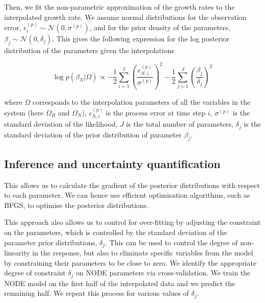 \documentclass[11pt, oneside]{article}
\begin{document}
Then, we fit the non-parametric approximation of the growth rates to the interpolated growth rate.
We assume normal distributions for the observation error, $\epsilon^{(p)}_i \sim \mathcal{N}(0,\sigma^{(p)})$, and for the prior density of the parameters, $\beta_j \sim \mathcal{N}(0,\delta_j)$.
This gives the following expression for the log posterior distribution of the parameters given the interpolations

\vspace{-0.5cm}
\begin{equation}
    \log p(\beta_N | \Omega) \propto - \frac{1}{2} \sum_{i=1}^{I} \left( \frac{\epsilon^{(p)}_{N,i}}{\sigma^{(p)}} \right)^2 - \frac{1}{2} \sum_{j=1}^{J} \left( \frac{\beta_j}{\delta_j} \right)^2
\end{equation}

where $\Omega$ corresponds to the interpolation parameters of all the variables in the system (here $\Omega_R$ and $\Omega_N$), 
$\epsilon^{(p)}_{N,i}$ is the process error at time step $i$, 
$\sigma^{(p)}$ is the standard deviation of the likelihood, 
$J$ is the total number of parameters, 
$\delta_j$ is the standard deviation of the prior distribution of parameter $\beta_j$.

\subsection{Inference and uncertainty quantification}

This allows us to calculate the gradient of the posterior distributions with respect to each parameter.
We can hence use efficient optimisation algorithms, such as BFGS, to optimise the posterior distributions.

This approach also allows us to control for over-fitting by adjusting the constraint on the parameters, which is controlled by the standard deviation of the parameter prior distributions, $\delta_j$.
This can be used to control the degree of non-linearity in the response, but also to eliminate specific variables from the model by constraining their parameters to be close to zero.
We identify the appropriate degree of constraint $\delta_j$ on NODE parameters via cross-validation. 
We train the NODE model on the first half of the interpolated data and we predict the remaining half.
We repeat this process for various values of $\delta_j$.
\end{document}
